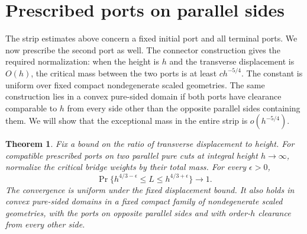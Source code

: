 \documentclass[11pt]{article}
\numberwithin{equation}{section}
\newtheorem{theorem}{Theorem}[section]
\theoremstyle{definition}\newtheorem{definition}[theorem]{Definition}
\theoremstyle{remark}\newtheorem{remark}[theorem]{Remark}
\begin{document}
\section{Prescribed ports on parallel sides}\label{c:parallel-section}

The strip estimates above concern a fixed initial port and all terminal
ports.  We now prescribe the second port as well.  The connector
construction gives the required normalization: when the height is $h$
and the transverse displacement is $O(h)$, the critical mass between the
two ports is at least $ch^{-5/4}$.  The constant is uniform over fixed
compact nondegenerate scaled geometries.  The same construction lies in
a convex pure-sided domain if both ports have clearance comparable to
$h$ from every side other than the opposite parallel sides containing
them.  We will show that the exceptional mass in the entire strip is
$o(h^{-5/4})$.

\begin{theorem}\label{c:parallel}
Fix a bound on the ratio of transverse displacement to height.  For
compatible prescribed ports on two parallel pure cuts at integral height
$h\to\infty$, normalize the critical bridge weights by their total
mass.  For every $\epsilon>0$,
\[
 \Pr\{h^{4/3-\epsilon}\le L
                       \le h^{4/3+\epsilon}\}\longrightarrow1.
\]
The convergence is uniform under the fixed displacement bound.  It also
holds in convex pure-sided domains in a fixed compact family of
nondegenerate scaled geometries, with the ports on opposite parallel
sides and with order-$h$ clearance from every other side.
\end{theorem}
\end{document}
